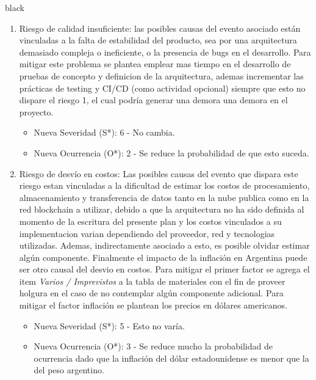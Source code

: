 \documentclass[
11pt, %
]{charter}
\begin{document}
\begin{consigna}{black}
\begin{enumerate}
	
	\item Riesgo de calidad insuficiente: las posibles causas del evento asociado están vinculadas a la falta de estabilidad del producto, sea por una arquitectura demasiado compleja o ineficiente, o la presencia de bugs en el desarrollo. Para mitigar este problema se plantea emplear mas tiempo en el desarrollo de pruebas de concepto y definicion de la arquitectura, ademas incrementar las prácticas de testing y CI/CD (como actividad opcional) siempre que esto no dispare el riesgo 1, el cual podría generar una demora una demora en el proyecto.
	\begin{itemize}
		\item Nueva Severidad (S*): 6 - No cambia.
		\item Nueva Ocurrencia (O*): 2 - Se reduce la probabilidad de que esto suceda.
	\end{itemize}	
	
	\item Riesgo de desvío en costos: Las posibles causas del evento que dispara este riesgo estan vinculadas a la dificultad de estimar los costos de procesamiento, almacenamiento y transferencia de datos tanto en la nube publica como en la red blockchain a utilizar, debido a que la arquitectura no ha sido definida al momento de la escritura del presente plan y los costos vinculados a su implementacion varian dependiendo del proveedor, red y tecnologias utilizadas. Ademas, indirectamente asociado a esto, es posible olvidar estimar algún componente. Finalmente el impacto de la inflación en Argentina puede ser otro causal del desvio en costos. Para mitigar el primer factor se agrega el item \textit{Varios / Imprevistos} a la tabla de materiales con el fin de proveer holgura en el caso de no contemplar algún componente adicional. Para mitigar el factor inflación se plantean los precios en dólares americanos.
	\begin{itemize}
		\item Nueva Severidad (S*): 5 - Esto no varía.
		\item Nueva Ocurrencia (O*): 3 - Se reduce mucho la probabilidad de ocurrencia dado que la inflación del dólar estadounidense es menor que la del peso argentino.
	\end{itemize}
\end{enumerate}


\end{consigna}
\end{document}
